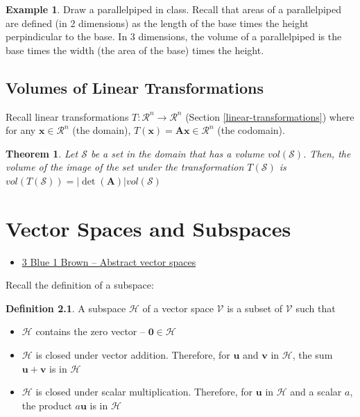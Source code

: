 \documentclass[
]{book}
\providecommand{\tightlist}{%
  \setlength{\itemsep}{0pt}\setlength{\parskip}{0pt}}
\newtheorem{theorem}{Theorem}[chapter]
\theoremstyle{definition}
\newtheorem{definition}{Definition}[chapter]
\theoremstyle{definition}
\newtheorem{example}{Example}[chapter]
\theoremstyle{definition}
\theoremstyle{definition}
\theoremstyle{remark}
\begin{document}
\begin{example}
Draw a parallelpiped in class. Recall that areas of a parallelpiped are defined (in 2 dimensions) as the length of the base times the height perpindicular to the base. In 3 dimensions, the volume of a parallelpiped is the base times the width (the area of the base) times the height.
\end{example}

\hypertarget{volumes-of-linear-transformations}{%
\section{Volumes of Linear Transformations}\label{volumes-of-linear-transformations}}

Recall linear transformations \(T:\mathcal{R}^n \rightarrow \mathcal{R}^n\) (Section \ref{linear-transformations}) where for any \(\mathbf{x} \in \mathcal{R}^n\) (the domain), \(T(\mathbf{x}) = \mathbf{A} \mathbf{x} \in \mathcal{R}^n\) (the codomain).

\begin{theorem}
Let \(\mathcal{S}\) be a set in the domain that has a volume \(vol(\mathcal{S})\). Then, the volume of the image of the set under the transformation \(T(\mathcal{S})\) is \(vol(T(\mathcal{S})) = |\det(\mathbf{A})|vol(\mathcal{S})\)
\end{theorem}

\hypertarget{vector-spaces-and-subspaces}{%
\chapter{Vector Spaces and Subspaces}\label{vector-spaces-and-subspaces}}

\begin{itemize}
\tightlist
\item
  \href{https://www.3blue1brown.com/lessons/abstract-vector-spaces}{3 Blue 1 Brown -- Abstract vector spaces}
\end{itemize}

Recall the definition of a subspace:

\begin{definition}

A subspace \(\mathcal{H}\) of a vector space \(\mathcal{V}\) is a subset of \(\mathcal{V}\) such that

\begin{itemize}
\item
  \(\mathcal{H}\) contains the zero vector -- \(\mathbf{0} \in \mathcal{H}\)
\item
  \(\mathcal{H}\) is closed under vector addition. Therefore, for \(\mathbf{u}\) and \(\mathbf{v}\) in \(\mathcal{H}\), the sum \(\mathbf{u} + \mathbf{v}\) is in \(\mathcal{H}\)
\item
  \(\mathcal{H}\) is closed under scalar multiplication. Therefore, for \(\mathbf{u}\) in \(\mathcal{H}\) and a scalar \(a\), the product \(a \mathbf{u}\) is in \(\mathcal{H}\)
\end{itemize}

\end{definition}
\end{document}
